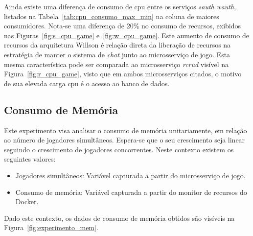 Ainda existe uma diferença de consumo de \ac{cpu} entre os serviços \textit{sauth} \textit{wauth}, listados na Tabela~\ref{tab:cpu_consumo_max_min} na coluna de maiores consumidores.
%
Nota-se uma diferença de 20\% no consumo de recursos, exibidos nas Figuras~\ref{fig:s_cpu_game} e~\ref{fig:w_cpu_game}.
%
Este aumento de consumo de recursos da arquitetura Willson é relação direta da liberação de recursos na estratégia de manter o sistema de \textit{chat} junto ao microsserviço de jogo.
%
Esta mesma característica pode ser comparada ao microsserviço \textit{rcrud} visível na Figura~\ref{fig:r_cpu_game}, visto que em ambos microsserviços citados, o motivo de sua elevada carga \ac{cpu} é o acesso ao banco de dados.



\subsection{Consumo de Memória}


Este experimento visa analisar o consumo de memória unitariamente, em relação ao número de jogadores simultâneos.
%
Espera-se que o seu crescimento seja linear seguindo o crescimento de jogadores concorrentes.
%
Neste contexto existem os seguintes valores:



\begin{itemize}
    \item Jogadores simultâneos: Variável capturada a partir do microsserviço de jogo.
    \item Consumo de memória: Variável capturada a partir do monitor de recursos do Docker.
\end{itemize}

Dado este contexto, os dados de consumo de memória obtidos são visíveis na Figura~\ref{fig:experimento_mem}.



